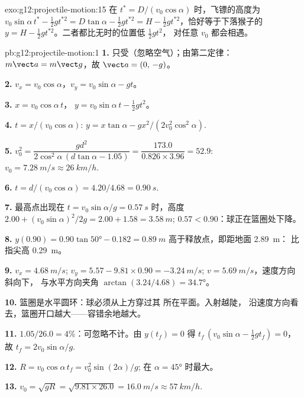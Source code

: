 \begin{solution}{exo:g12:projectile-motion:15}
在 $t^* = D/(v_0\cos\alpha)$ 时，飞镖的高度为
$v_0\sin\alpha\, t^* - \tfrac12 g t^{*2} = D\tan\alpha - \tfrac12 g
t^{*2} = H - \tfrac12 g t^{*2}$，恰好等于下落猴子的
$y = H - \tfrac12 g t^{*2}$。二者都比无时的位置低 $\tfrac12 gt^2$，
对任意 $v_0$ 都会相遇。
\end{solution}

\begin{solution}{pb:g12:projectile-motion:1}
\textbf{1.} 只受（忽略空气）；由第二定律：
$m\vect a = m\vect g$，故 $\vect a = (0,\,-g)$。

\textbf{2.} $v_x = v_0\cos\alpha$，$v_y = v_0\sin\alpha - gt$。

\textbf{3.} $x = v_0\cos\alpha\, t$，
$y = v_0\sin\alpha\, t - \tfrac12 gt^2$。

\textbf{4.} $t = x/(v_0\cos\alpha)$:
$y = x\tan\alpha - g x^2/(2v_0^2\cos^2\alpha)$.

\textbf{5.} $v_0^2 = \dfrac{g d^2}{2\cos^2\alpha\,(d\tan\alpha -
1.05)} = \dfrac{173.0}{0.826 \times 3.96} = 52.9$:
$v_0 = \qty{7.28}{m/s} \approx \qty{26}{km/h}$.

\textbf{6.} $t = d/(v_0\cos\alpha) = 4.20/4.68 = \qty{0.90}{s}$.

\textbf{7.} 最高点出现在 $t = v_0\sin\alpha/g = \qty{0.57}{s}$ 时，高度
$2.00 + (v_0\sin\alpha)^2/2g = 2.00 + 1.58 = \qty{3.58}{m}$;
$0.57 < 0.90$：球正在篮圈处下降。

\textbf{8.} $y(0.90) = 0.90\tan\ang{50} - 0.182 = \qty{0.89}{m}$
高于释放点，即距地面 \qty{2.89}{m}：
比指尖高 \qty{0.29}{m}。

\textbf{9.} $v_x = \qty{4.68}{m/s}$;
$v_y = 5.57 - 9.81 \times 0.90 = \qty{-3.24}{m/s}$;
$v = \qty{5.69}{m/s}$，速度方向斜向下，
与水平方向夹角 $\arctan(3.24/4.68) = \ang{34.7}$。

\textbf{10.} 篮圈是水平圆环：球必须从上方穿过其
所在平面。入射越陡，
沿速度方向看去，篮圈开口越大——容错余地越大。

\textbf{11.} $1.05/26.0 = 4\%$：可忽略不计。由 $y(t_f) = 0$ 得
$t_f\,(v_0\sin\alpha - \tfrac12 g t_f) = 0$，故
$t_f = 2v_0\sin\alpha/g$.

\textbf{12.} $R = v_0\cos\alpha\, t_f = v_0^2\sin(2\alpha)/g$;
在 $\alpha = \ang{45}$ 时最大。

\textbf{13.} $v_0 = \sqrt{gR} = \sqrt{9.81 \times 26.0} =
\qty{16.0}{m/s} \approx \qty{57}{km/h}$.


\end{solution}
